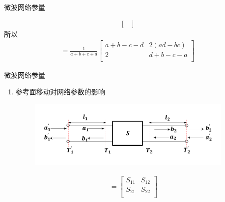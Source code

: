\begin{frame}{微波网络参量}
\begin{enumerate}
\begin{align*}
\begin{bmatrix*}
                  \end{bmatrix*}
              \end{align*}
              所以
              \begin{align*}
                  [S]=\frac{1}{a+b+c+d}
                  \begin{bmatrix*}
                      a+b-c-d & 2(ad-bc) \\
                      2 & d+b-c-a \\
                  \end{bmatrix*}
              \end{align*}
              \saveenum
    \end{enumerate}
\end{frame}

\begin{frame}{微波网络参量}
    \begin{enumerate}
        \resume
        \item 参考面移动对网络参数的影响
              \begin{figure}
                  \includegraphics[width=10cm]{Cha5//fig5-18.pdf}
              \end{figure}
              \begin{gather*}
                  [S]=\begin{bmatrix*}
                      S_{11} & S_{12} \\
                      S_{21} & S_{22} \\
                  \end{bmatrix*}
              \end{gather*}
    \end{enumerate}
\end{frame}

